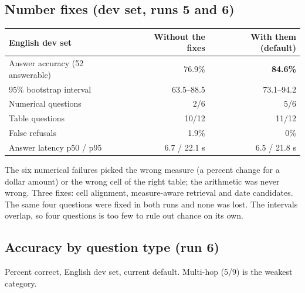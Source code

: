 \documentclass[10pt,a4paper]{article}
\newcommand{\note}[1]{{\raggedright\color{muted}\fontsize{8.3}{10}\selectfont #1\par}}
\begin{document}
\vspace{4pt}
\begin{minipage}[t]{0.49\textwidth}
\subsection{Number fixes (dev set, runs 5 and 6)}
\renewcommand{\arraystretch}{1.2}
{\fontsize{8.4}{10.2}\selectfont
\begin{tabularx}{\linewidth}{@{}X r r@{}}
\toprule
English dev set & Without the fixes & \textbf{With them (default)} \\ \midrule
Answer accuracy (52 answerable) & 76.9\% & \textbf{84.6\%} \\
95\% bootstrap interval & 63.5--88.5 & 73.1--94.2 \\
Numerical questions & 2/6 & 5/6 \\
Table questions & 10/12 & 11/12 \\
False refusals & 1.9\% & 0\% \\
Answer latency p50 / p95 & 6.7 / 22.1 s & 6.5 / 21.8 s \\
\bottomrule
\end{tabularx}}
\note{The six numerical failures picked the wrong measure (a percent change for a dollar amount) or the wrong cell of the right table; the arithmetic was never wrong.
Three fixes: cell alignment, measure-aware retrieval and date candidates. The same four questions were fixed in both runs and none was lost.
The intervals overlap, so four questions is too few to rule out chance on its own.}
\end{minipage}\hfill
\begin{minipage}[t]{0.47\textwidth}
\subsection{Accuracy by question type (run 6)}
\par
\note{Percent correct, English dev set, current default. Multi-hop (5/9) is the weakest category.}
\end{minipage}
\end{document}
